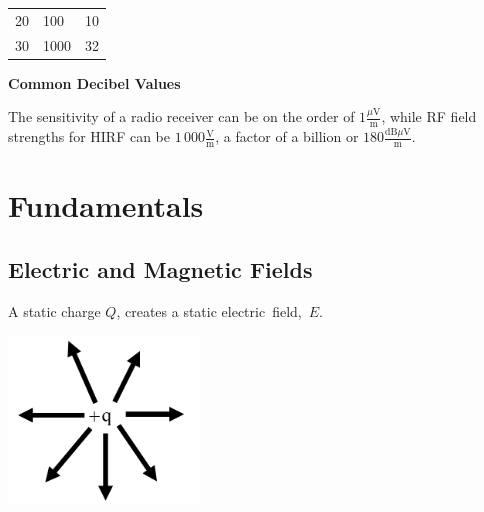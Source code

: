 \documentclass[
]{book}
\begin{document}
\begin{longtable}[]{@{}lll@{}}
\begin{minipage}[t]{0.11\columnwidth}\raggedright
20\strut
\end{minipage} & \begin{minipage}[t]{0.14\columnwidth}\raggedright
100\strut
\end{minipage} & \begin{minipage}[t]{0.15\columnwidth}\raggedright
10\strut
\end{minipage}\tabularnewline
\begin{minipage}[t]{0.11\columnwidth}\raggedright
30\strut
\end{minipage} & \begin{minipage}[t]{0.14\columnwidth}\raggedright
1000\strut
\end{minipage} & \begin{minipage}[t]{0.15\columnwidth}\raggedright
32\strut
\end{minipage}\tabularnewline
\bottomrule
\end{longtable}

\textbf{Common Decibel Values}

The sensitivity of a radio receiver can be on the order of
\(1 \frac{\mu \text{V}}{\text{m}}\), while RF field strengths for
HIRF can be \(1\,000 \frac{\text{V}}{\text{m}}\), a factor of a
billion or \(180 \frac{\text{dB}\mu\text{V}}{\text{m}}\).

\hypertarget{fundamentals-1}{%
\section{Fundamentals}\label{fundamentals-1}}

\hypertarget{electric-and-magnetic-fields}{%
\subsection{Electric and Magnetic Fields}\label{electric-and-magnetic-fields}}

A static charge \(Q\), creates a static electric~field,~\(E\).

\includegraphics[width=2in,height=\textheight]{media/14/charge-field.png}
\end{document}
